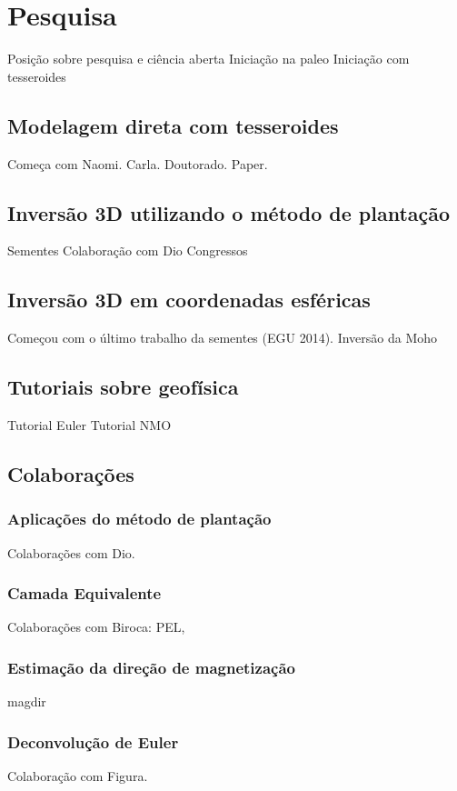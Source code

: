 \section{Pesquisa}

Posição sobre pesquisa e ciência aberta
Iniciação na paleo
Iniciação com tesseroides


\subsection{Modelagem direta com tesseroides}

Começa com Naomi. Carla. Doutorado.
Paper.

\subsection{Inversão 3D utilizando o método de plantação}

Sementes
Colaboração com Dio
Congressos


\subsection{Inversão 3D em coordenadas esféricas}


Começou com o último trabalho da sementes (EGU 2014).
Inversão da Moho


\subsection{Tutoriais sobre geofísica}

Tutorial Euler
Tutorial NMO


\subsection{Colaborações}


\subsubsection{Aplicações do método de plantação}

Colaborações com Dio.


\subsubsection{Camada Equivalente}

Colaborações com Biroca: PEL,


\subsubsection{Estimação da direção de magnetização}

magdir


\subsubsection{Deconvolução de Euler}

Colaboração com Figura.
